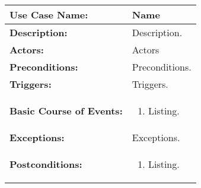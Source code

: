 
\begin{tabularx}{\linewidth}{|l|X|}
\hline
\textbf{Use Case Name:} & \textbf{Name} \\
\hline
\textbf{Description:} & 
Description. \\
\hline
\textbf{Actors:} & Actors \\
\hline
\textbf{Preconditions:} & Preconditions. \\
\hline
\textbf{Triggers:} & Triggers. \\
\hline
\textbf{Basic Course of Events:} & 
\begin{minipage}{\linewidth} 
  \vspace{0.05em}
  \begin{enumerate}
   \item Listing.
  \end{enumerate}
  \vspace{0.05em}
\end{minipage}
\\
\hline 
\textbf{Exceptions:} & 
Exceptions.
\\
\hline 
\textbf{Postconditions:} &
\begin{minipage}{\linewidth}
  \vspace{0.05em}
  \begin{enumerate}
    \item Listing.
  \end{enumerate}
  \vspace{0.05em}
\end{minipage}
\\
\hline
\end{tabularx}


